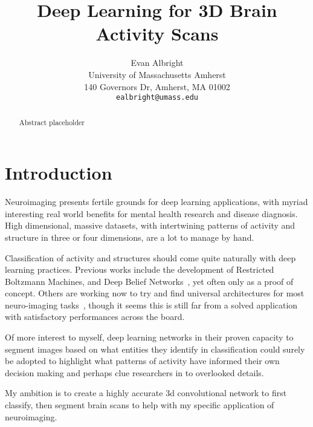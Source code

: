 \documentclass[10pt,twocolumn,letterpaper]{article}
\begin{document}
\title{Deep Learning for 3D Brain Activity Scans}

\author{Evan Albright\\
University of Massachusetts Amherst\\
140 Governors Dr, Amherst, MA 01002\\
{\tt\small ealbright@umass.edu}
}

\maketitle

\begin{abstract}
   Abstract placeholder
\end{abstract}

\section{Introduction}\label{sec:introduction}
Neuroimaging presents fertile grounds for deep learning applications, with myriad interesting real world benefits
for mental health research and disease diagnosis.
High dimensional, massive datasets, with intertwining patterns of activity and structure in three or four
dimensions, are a lot to manage by hand.

Classification of activity and structures should come quite naturally with deep learning practices.
Previous works include the development of Restricted Boltzmann Machines, and Deep Belief Networks~\cite{plis2014deep},
yet often only as a proof of concept.
Others are working now to try and find universal architectures for most
neuro-imaging tasks~\cite{henschel2019fastsurfer}, though it seems this is still far from a solved
application with satisfactory performances across the board.

Of more interest to myself, deep learning networks in their proven capacity to segment images based on what entities
they identify in classification could surely be adopted to highlight what patterns of activity have informed their
own decision making and perhaps clue researchers in to overlooked details.

My ambition is to create a highly accurate 3d convolutional network to first classify, then segment brain scans to
help with my specific application of neuroimaging.
\end{document}
